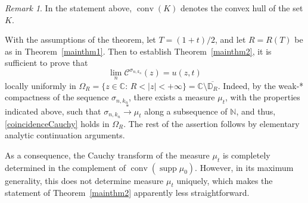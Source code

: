 \documentclass[reqno,11pt]{amsart}
\theoremstyle{plain}
\theoremstyle{definition}
\theoremstyle{remark}
\newtheorem{remark}[thm]{Remark}
\numberwithin{equation}{section}
\numberwithin{equation}{section}
\DeclareMathOperator{\supp}{supp}
\DeclareMathOperator{\conv}{conv}
\newcommand{\N}{\mathbb{N}}
\newcommand{\C}{\mathbb{C}}
\newcommand{\D}{\mathbb{D}}
\begin{document}
\begin{remark}
In the statement above, $ \conv (K)$ denotes the convex hull of the set $K$. 

With the assumptions of the theorem, let $T=(1+t)/2$, and let $R=R(T)$ be as in Theorem~\ref{mainthm1}. Then to establish Theorem~\ref{mainthm2}, it is sufficient to prove that
$$
\lim_n  \mathcal C^{  \sigma_{n,k_n}}(z) =u(z,t)
$$
locally uniformly in $\Omega_R =\{z\in \C:\, R<|z|<+\infty\}=\C \setminus \overline{\D_R} $.  Indeed, by the weak-* compactness of the sequence $\sigma_{n, k_n} $, there exists a measure $\mu_t$, with the properties indicated above, such that $\sigma_{n, k_n} \stackrel{*}{\longrightarrow} \mu_t$ along a subsequence of $\N$, and thus, \eqref{coincidenceCauchy} holds in $\Omega_R$. The rest of the assertion follows by elementary analytic continuation arguments.

As a consequence, the  Cauchy transform of the measure $\mu_t$ is completely determined in the complement of $ \conv (\supp \mu_0)$. However, in its maximum generality, this does not determine measure $\mu_t$ uniquely, which makes the statement of Theorem~\ref{mainthm2} apparently less straightforward. 
\end{remark}
\end{document}

